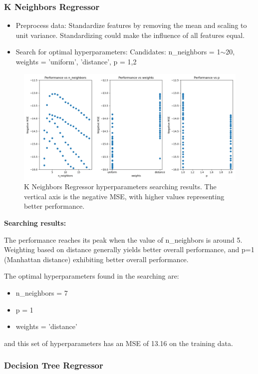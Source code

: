 \documentclass[a4paper]{article}
\begin{document}
\subsubsection{K Neighbors Regressor}

\begin{itemize}
    \item Preprocess data: Standardize features by removing the mean and scaling to unit variance. Standardizing could make the influence of all features equal.
    \item Search for optimal hyperparameters: Candidates: n\_neighbors = 1$\sim$20, weights = 'uniform', 'distance', p = 1,2    
\end{itemize}

\begin{figure}[htbp]
    \centering
    \includegraphics[width = 0.8\linewidth]{Pics/KNR_training.png}
    \caption[]{K Neighbors Regressor hyperparameters searching results. The vertical axis is the negative MSE, with higher values representing better performance.}
    \label{fig:KNR_Searching}
\end{figure}
\FloatBarrier

\textbf{Searching results:}


The performance reaches its peak when the value of n\_neighbors is around 5. Weighting based on distance generally yields better overall performance, and p=1 (Manhattan distance) exhibiting better overall performance.

The optimal hyperparameters found in the searching are: 
\begin{itemize}
    \item n\_neighbors = 7
    \item p = 1
    \item weights = 'distance'
\end{itemize}

and this set of hyperparameters has an MSE of 13.16 on the training data. 


\subsubsection{Decision Tree Regressor}
\end{document}
